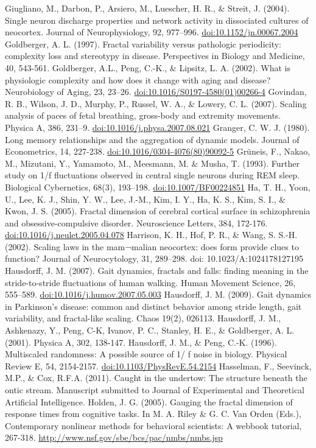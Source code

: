\documentclass[12pt,]{book}
\begin{document}
Giugliano, M., Darbon, P., Arsiero, M., Luescher, H. R., \& Streit, J. (2004). Single neuron discharge properties and network activity in dissociated cultures of neocortex. Journal of Neurophysiology, 92, 977--996. \url{doi:10.1152/jn.00067.2004}
Goldberger, A. L. (1997). Fractal variability versus pathologic periodicity: complexity loss and stereotypy in disease. Perspectives in Biology and Medicine, 40, 543-561.
Goldberger, A.L., Peng, C.-K., \& Lipsitz, L. A. (2002). What is physiologic complexity and how does it change with aging and disease? Neurobiology of Aging, 23, 23--26. \url{doi:10.1016/S0197-4580(01)00266-4}
Govindan, R. B., Wilson, J. D., Murphy, P., Russel, W. A., \& Lowery, C. L. (2007). Scaling analysis of paces of fetal breathing, gross-body and extremity movements. Physica A, 386, 231--9. \url{doi:10.1016/j.physa.2007.08.021}
Granger, C. W. J. (1980). Long memory relationships and the aggregation of dynamic models. Journal of Econometrics, 14, 227-238. \url{doi:10.1016/0304-4076(80)90092-5}
Grüneis, F., Nakao, M., Mizutani, Y., Yamamoto, M., Meesmann, M. \& Musha, T. (1993). Further study on 1/f fluctuations observed in central single neurons during REM sleep. Biological Cybernetics, 68(3), 193--198. \url{doi:10.1007/BF00224851}
Ha, T. H., Yoon, U., Lee, K. J., Shin, Y. W., Lee, J.-M., Kim, I. Y., Ha, K. S., Kim, S. I., \& Kwon, J. S. (2005). Fractal dimension of cerebral cortical surface in schizophrenia and obsessive-compulsive disorder. Neuroscience Letters, 384, 172-176. \url{doi:10.1016/j.neulet.2005.04.078}
Harrison, K. H., Hof, P. R., \& Wang, S. S.-H. (2002). Scaling laws in the mam¬malian neocortex: does form provide clues to function? Journal of Neurocytology, 31, 289--298. doi: 10.1023/A:1024178127195
Hausdorff, J. M. (2007). Gait dynamics, fractals and falls: finding meaning in the stride-to-stride fluctuations of human walking. Human Movement Science, 26, 555--589. \url{doi:10.1016/j.humov.2007.05.003}
Hausdorff, J. M. (2009). Gait dynamics in Parkinson's disease: common and distinct behavior among stride length, gait variability, and fractal-like scaling. Chaos 19(2), 026113.
Hausdorff, J. M., Ashkenazy, Y., Peng, C-K, Ivanov, P. C., Stanley, H. E., \& Goldberger, A. L. (2001). Physica A, 302, 138-147.
Hausdorff, J. M., \& Peng, C.-K. (1996). Multiscaled randomness: A possible source of 1/ f noise in biology. Physical Review E, 54, 2154-2157. \url{doi:10.1103/PhysRevE.54.2154}
Hasselman, F., Seevinck, M.P., \& Cox, R.F.A. (2011). Caught in the undertow: The structure beneath the ontic stream. Manuscript submitted to Journal of Experimental and Theoretical Artificial Intelligence.
Holden, J. G. (2005). Gauging the fractal dimension of response times from cognitive tasks. In M. A. Riley \& G. C. Van Orden (Eds.), Contemporary nonlinear methods for behavioral scientists: A webbook tutorial, 267-318. \url{http://www.nsf.gov/sbe/bcs/pac/nmbs/nmbs.jsp}
\end{document}
